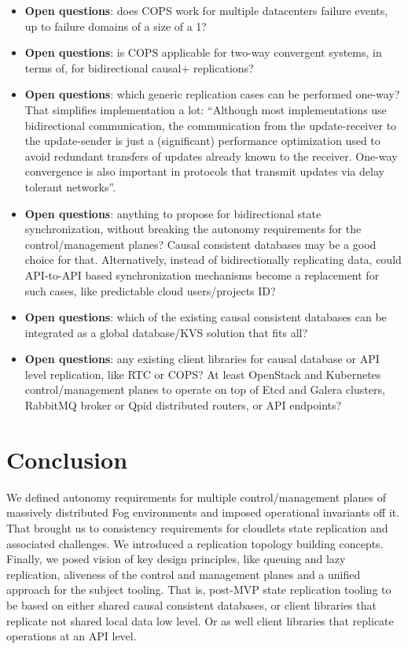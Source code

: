 \documentclass[conference]{IEEEtran}
\begin{document}
\begin{itemize}
  \item \textbf{Open questions}: does COPS work for multiple datacenters
    failure events, up to failure domains of a size of a 1?
  \item \textbf{Open questions}: is COPS applicable for two-way convergent
    systems, in terms of\cite{b2}, for bidirectional causal+ replications?
  \item \textbf{Open questions}: which generic replication cases can be
    performed one-way? That simplifies implementation a lot: ``Although most
    implementations use bidirectional communication, the communication from the
    update-receiver to the update-sender is just a (significant) performance
    optimization used to avoid redundant transfers of updates already known to
    the receiver. One-way convergence is also important in protocols that
    transmit updates via delay tolerant networks''\cite{b2}.
  \item \textbf{Open questions}: anything to propose for bidirectional state
    synchronization, without breaking the autonomy requirements for the
    control/management planes? Causal consistent databases\cite{b6} may be a
    good choice for that. Alternatively, instead of bidirectionally replicating
    data, could API-to-API based synchronization mechanisms become a
    replacement for such cases, like predictable cloud users/projects ID?
  \item \textbf{Open questions}: which of the existing causal consistent
    databases\cite{b6} can be integrated as a global database/KVS solution that
    fits all?
  \item \textbf{Open questions}: any existing client libraries for causal
    database or API level replication, like RTC or COPS? At least OpenStack and
    Kubernetes control/management planes to operate on top of Etcd and Galera
    clusters, RabbitMQ broker or Qpid distributed routers, or API endpoints?
\end{itemize}

\section{Conclusion}

We defined autonomy requirements for multiple control/management planes of
massively distributed Fog environments and imposed operational invariants off
it. That brought us to consistency requirements for cloudlets state replication
and associated challenges. We introduced a replication topology building
concepts. Finally, we posed vision of key design principles, like queuing and
lazy replication, aliveness of the control and management planes and a unified
approach for the subject tooling. That is, post-MVP state replication tooling
to be based on either shared causal consistent databases, or client libraries
that replicate not shared local data low level. Or as well client libraries
that replicate operations at an API level.
\end{document}
